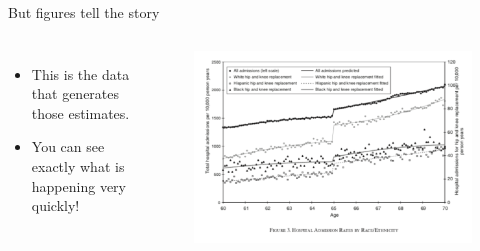 \documentclass[aspectratio=169]{beamer}
\begin{document}
\begin{frame}[fragile]{But figures tell the story}
	\begin{columns}[c]
		\begin{itemize}
			\item This is the data that generates those estimates.
			\item You can see exactly what is happening very quickly!
		\end{itemize}
		\begin{figure}
			\centering
			\includegraphics[width=\linewidth]{img/line}
		\end{figure}
	\end{columns}
\end{frame}
\end{document}
